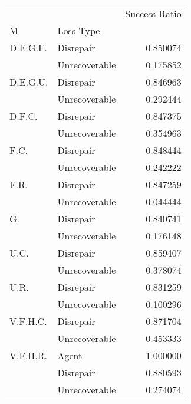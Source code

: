 \begin{tabular}{llr}
\toprule
         &               &  Success Ratio \\
M & Loss Type &                \\
\midrule
D.E.G.F. & Disrepair &       0.850074 \\
         & Unrecoverable &       0.175852 \\
D.E.G.U. & Disrepair &       0.846963 \\
         & Unrecoverable &       0.292444 \\
D.F.C. & Disrepair &       0.847375 \\
         & Unrecoverable &       0.354963 \\
F.C. & Disrepair &       0.848444 \\
         & Unrecoverable &       0.242222 \\
F.R. & Disrepair &       0.847259 \\
         & Unrecoverable &       0.044444 \\
G. & Disrepair &       0.840741 \\
         & Unrecoverable &       0.176148 \\
U.C. & Disrepair &       0.859407 \\
         & Unrecoverable &       0.378074 \\
U.R. & Disrepair &       0.831259 \\
         & Unrecoverable &       0.100296 \\
V.F.H.C. & Disrepair &       0.871704 \\
         & Unrecoverable &       0.453333 \\
V.F.H.R. & Agent &       1.000000 \\
         & Disrepair &       0.880593 \\
         & Unrecoverable &       0.274074 \\
\bottomrule
\end{tabular}

